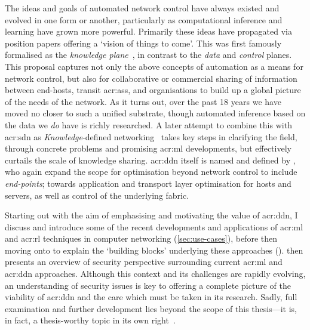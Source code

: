 The ideas and goals of automated network control have always existed and evolved in one form or another, particularly as computational inference and learning have grown more powerful.
Primarily these ideas have propagated via position papers offering a `vision of things to come'.
This was first famously formalised as the \emph{knowledge plane}~\parencite{DBLP:conf/sigcomm/ClarkPRW03}, in contrast to the \emph{data} and \emph{control} planes.
This proposal captures not only the above concepts of automation as a means for network control, but also for collaborative or commercial sharing of information between end-hosts, transit \glspl{acr:as}, and organisations to build up a global picture of the needs of the network.
As it turns out, over the past \num{18} years we have moved no closer to such a unified substrate, though automated inference based on the data we \emph{do} have is richly researched.
A later attempt to combine this with \gls{acr:sdn} as \emph{Knowledge}-defined networking~\parencite{DBLP:journals/corr/MestresRCBASMMB16} takes key steps in clarifying the field, through concrete problems and promising \gls{acr:ml} developments, but effectively curtails the scale of knowledge sharing.
\gls{acr:ddn} itself is named and defined by \Textcite{DBLP:conf/comsnets/JiangSSZ17}, who again expand the scope for optimisation beyond network control to include \emph{end-points}; towards application and transport layer optimisation for hosts and servers, as well as control of the underlying fabric.

Starting out with the aim of emphasising and motivating the value of \gls{acr:ddn}, I discuss and introduce some of the recent developments and applications of \gls{acr:ml} and \gls{acr:rl} techniques in computer networking (\cref{sec:use-cases}), before then moving onto to explain the `building blocks' underlying these approaches ().
 then presents an overview of security perspective surrounding current \gls{acr:ml} and \gls{acr:ddn} approaches.
Although this context and its challenges are rapidly evolving, an understanding of security issues is key to offering a complete picture of the viability of \gls{acr:ddn} and the care which must be taken in its research.
Sadly, full examination and further development lies beyond the scope of this thesis---it is, in fact, a thesis-worthy topic in its own right~\parencite{papernot-thesis}.

